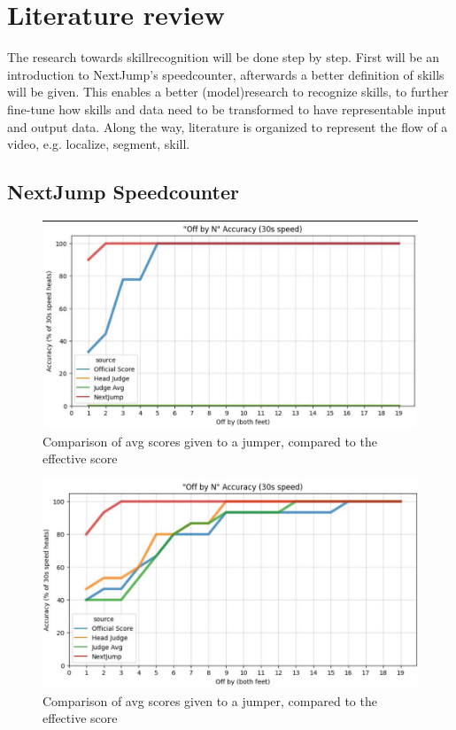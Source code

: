 
\section{Literature review}%
\label{sec:literature}


The research towards skillrecognition will be done step by step. First will be an introduction to NextJump's speedcounter, afterwards a better definition of skills will be given. This enables a better (model)research to recognize skills, to further fine-tune how skills and data need to be transformed to have representable input and output data. Along the way, literature is organized to represent the flow of a video, e.g. localize, segment, skill.

\subsection{NextJump Speedcounter}

\begin{figure}
    \centering
    \includegraphics[width=0.95\linewidth]{img/nextjump-off-by-feet}
    \caption[nextjump-results]{Comparison of avg scores given to a jumper, compared to the effective score}
    \label{fig:nextjump-off-by-feet}
\end{figure}

\begin{figure}
    \centering
    \includegraphics[width=0.95\linewidth]{img/nextjump-off-by-feet-judges}
    \caption[nextjump-results-multi]{Comparison of avg scores given to a jumper, compared to the effective score}
    \label{fig:nextjump-off-by-feet-judges}
\end{figure}

